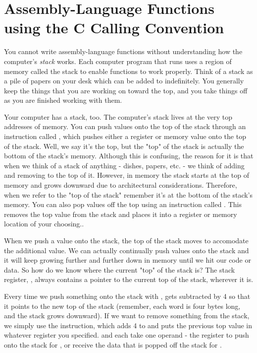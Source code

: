 \section{Assembly-Language Functions using the C Calling Convention}
\label{callingwritingassemblyfunctions}

You cannot write assembly-language functions without understanding
how the computer's \emph{stack} works.  Each computer
program that runs uses a region of memory called the stack to enable
functions to work properly.  Think of a stack as a pile of papers
on your desk which can be added to indefinitely.  You generally keep
the things that you are working on toward the top, and you take things
off as you are finished working with them.

Your computer has a stack, too.  The computer's stack lives at the very 
top addresses of memory.  You can push values onto the 
top of the stack through an instruction called
, which pushes either a register or
memory value onto the top of the stack.  Well, we say it's the top, but the
"top" of the stack is actually the bottom of the stack's memory.  
Although this is confusing, the reason for it is that when we think
of a stack of anything - dishes, papers, etc. - we think of adding and 
removing to the top of it.  However,
in memory the stack starts at the top of memory and grows downward due
to architectural considerations.  Therefore, when we refer to the
"top of the stack" remember it's at the bottom of the stack's memory.  
You can also pop values off the top using an instruction called
.
This removes the top value from the stack and places it into a register or memory location of your choosing..

When we push a value onto the stack, the top of the stack moves 
to accomodate the additional value.  We can actually continually 
push values onto the stack and it will keep growing further and
further down in memory until we hit our code or data.
So how do we know where the current "top" of the stack is?  The
stack register, {\espRegIdx}, always contains a pointer to the current top of the stack, wherever it is.

Every time we push something onto the stack with , 
{\espReg} gets subtracted by 4 so that it points to the new top of the stack 
(remember, each word is four bytes long, and the stack grows downward).  
If we want to remove something from the stack, we simply use the 
 instruction, which adds 4 to {\espReg} and puts the 
previous top value in whatever register you specified.  
 and  each
take one operand - the register to push onto the stack for 
, or receive the data that is popped off the stack
for .

